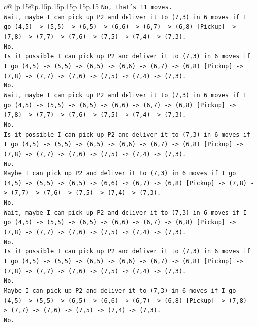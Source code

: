 \documentclass{article}
\begin{document}
{\begin{supertabular}{c@{$\;$}|p{.15\linewidth}@{}p{.15\linewidth}p{.15\linewidth}p{.15\linewidth}p{.15\linewidth}p{.15\linewidth}}
{{{\texttt{No, that's 11 moves.} \\
\texttt{Wait, maybe I can pick up P2 and deliver it to (7,3) in 6 moves if I go (4,5) {-}> (5,5) {-}> (6,5) {-}> (6,6) {-}> (6,7) {-}> (6,8) {[}Pickup{]} {-}> (7,8) {-}> (7,7) {-}> (7,6) {-}> (7,5) {-}> (7,4) {-}> (7,3).} \\
\texttt{No.} \\
\texttt{Is it possible I can pick up P2 and deliver it to (7,3) in 6 moves if I go (4,5) {-}> (5,5) {-}> (6,5) {-}> (6,6) {-}> (6,7) {-}> (6,8) {[}Pickup{]} {-}> (7,8) {-}> (7,7) {-}> (7,6) {-}> (7,5) {-}> (7,4) {-}> (7,3).} \\
\texttt{No.} \\
\texttt{Wait, maybe I can pick up P2 and deliver it to (7,3) in 6 moves if I go (4,5) {-}> (5,5) {-}> (6,5) {-}> (6,6) {-}> (6,7) {-}> (6,8) {[}Pickup{]} {-}> (7,8) {-}> (7,7) {-}> (7,6) {-}> (7,5) {-}> (7,4) {-}> (7,3).} \\
\texttt{No.} \\
\texttt{Is it possible I can pick up P2 and deliver it to (7,3) in 6 moves if I go (4,5) {-}> (5,5) {-}> (6,5) {-}> (6,6) {-}> (6,7) {-}> (6,8) {[}Pickup{]} {-}> (7,8) {-}> (7,7) {-}> (7,6) {-}> (7,5) {-}> (7,4) {-}> (7,3).} \\
\texttt{No.} \\
\texttt{Maybe I can pick up P2 and deliver it to (7,3) in 6 moves if I go (4,5) {-}> (5,5) {-}> (6,5) {-}> (6,6) {-}> (6,7) {-}> (6,8) {[}Pickup{]} {-}> (7,8) {-}> (7,7) {-}> (7,6) {-}> (7,5) {-}> (7,4) {-}> (7,3).} \\
\texttt{No.} \\
\texttt{Wait, maybe I can pick up P2 and deliver it to (7,3) in 6 moves if I go (4,5) {-}> (5,5) {-}> (6,5) {-}> (6,6) {-}> (6,7) {-}> (6,8) {[}Pickup{]} {-}> (7,8) {-}> (7,7) {-}> (7,6) {-}> (7,5) {-}> (7,4) {-}> (7,3).} \\
\texttt{No.} \\
\texttt{Is it possible I can pick up P2 and deliver it to (7,3) in 6 moves if I go (4,5) {-}> (5,5) {-}> (6,5) {-}> (6,6) {-}> (6,7) {-}> (6,8) {[}Pickup{]} {-}> (7,8) {-}> (7,7) {-}> (7,6) {-}> (7,5) {-}> (7,4) {-}> (7,3).} \\
\texttt{No.} \\
\texttt{Maybe I can pick up P2 and deliver it to (7,3) in 6 moves if I go (4,5) {-}> (5,5) {-}> (6,5) {-}> (6,6) {-}> (6,7) {-}> (6,8) {[}Pickup{]} {-}> (7,8) {-}> (7,7) {-}> (7,6) {-}> (7,5) {-}> (7,4) {-}> (7,3).} \\
\texttt{No.} \\
}}}
\end{supertabular}}
\end{document}
